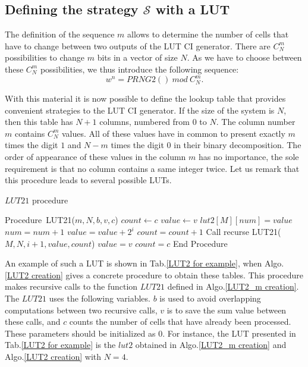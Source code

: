 \subsection{Defining the strategy $\mathcal{S}$ with a LUT}
\label {LUT2}
The definition of the sequence $m$ allows to determine the number of cells 
that have to change between two outputs of the LUT CI generator.
There are $C_N^m$ possibilities to change $m$ bits in a vector of size $N$.
As we have to choose between these $C_N^m$ possibilities, we thus introduce the following sequence:
\begin{equation}
w^n=PRNG2()~mod~C^m_N.
\end{equation}

With this material it is now possible to define the lookup table that provides convenient strategies to the LUT CI generator.
If the size of the system is $N$, then this table has $N+1$ columns, numbered from $0$ to $N$.
The column number $m$ contains $C_N^m$ values.
All of these values have in common to present exactly $m$ times the digit $1$ 
and $N-m$ times the digit $0$ in their binary decomposition.
The order of appearance of these values in the column $m$ has no importance, 
the sole requirement is that no column contains a same integer twice.
Let us remark that this procedure leads to several possible LUTs.

\begin{algorithm}
\caption{$LUT21$ procedure}\label{LUT2_m creation}
\begin{algorithmic}[1]
\STATE Procedure~{LUT21}{($m,N,b,v,c$)}
\STATE $count\gets c$
\STATE $value\gets v$
    \STATE $lut2[M][num] = value$
    \STATE $num = num + 1$
  \ELSE
     \STATE $value = value + 2^i$
     \STATE $count = count + 1$
     \STATE  Call {recurse LUT21}{($M,N,i+1,value,count$)}
     \STATE $value = v$
     \STATE $count = c$
   \ENDFOR
 \ENDIF
\STATE End Procedure
\end{algorithmic}
\end{algorithm}

An example of such a LUT is shown in Tab.\ref{LUT2 for example}, 
when Algo.\ref{LUT2 creation} gives a concrete procedure to obtain these tables.
This procedure makes recursive calls to the function $LUT21$ defined in Algo.\ref{LUT2_m creation}.
The $LUT21$ uses the following variables.
$b$ is used to avoid overlapping computations between two recursive calls, 
$v$ is to save the sum value between these calls, and $c$ counts the number of cells that have already been processed.
These parameters should be initialized as $0$.
For instance, the LUT presented in Tab.\ref{LUT2 for example} is 
the $lut2$ obtained in Algo.\ref{LUT2_m creation} and Algo.\ref{LUT2 creation} with $N=4$.


